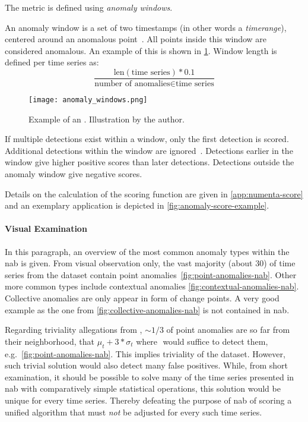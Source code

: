 The metric is defined using \textit{anomaly windows}.
\begin{definition}\label{def:anomaly-window}
    An anomaly window is a set of two timestamps (in other words a \textit{timerange}),
    centered around an anomalous point~\cite[cf.][]{Lavin.2015}. All points inside
    this window are considered anomalous. An example of this is shown in \cref{fig:anomaly-window}.
    Window length is defined per time series as:
    \[\frac{\text{len}(\text{time series}) * 0.1}{\text{number of anomalies}\in \text{time series}}\]
    \begin{figure}[htp!]
        \centering
        \texttt{[image: anomaly\_windows.png]}
        \caption{Example of an . Illustration
        by the author.}\label{fig:anomaly-window}
    \end{figure}
\end{definition}
If multiple detections exist within a window, only the first detection is scored.
Additional detections within the window are ignored~\cite[cf.][]{Lavin.2015}.
Detections earlier in the window give higher positive scores than later detections.
Detections outside the anomaly window give negative scores.

Details on the calculation of the scoring function are given in \cref{app:numenta-score}
and an exemplary application is depicted in \cref{fig:anomaly-score-example}.


\paragraph{Visual Examination}
In this paragraph, an overview of the most common anomaly types within the \gls{nab}
is given. From visual observation only, the vast majority (about 30) of time
series from the dataset contain point anomalies~\cref{fig:point-anomalies-nab}.
Other more common types include contextual anomalies \cref{fig:contextual-anomalies-nab}.
Collective anomalies are only appear in form of change points. A very good example
as the one from \cref{fig:collective-anomalies-nab} is not contained in \gls{nab}.

Regarding triviality allegations from \textcite{Lavin.2015}, \(\sim 1/3\) of
point anomalies are so far from their neighborhood, that \(\mu_t + 3*\sigma_t\)
where \(\) would suffice to detect them, e.g.\ \cref{fig:point-anomalies-nab}.
This implies triviality of the dataset. However, such trivial solution would
also detect many false positives. While, from short examination, it should be
possible to solve many of the time series presented in \gls{nab} with
comparatively simple statistical operations, this solution would be unique for
every time series. Thereby defeating the purpose of \gls{nab} of scoring a
unified algorithm that must \textit{not} be adjusted for every such time series.

